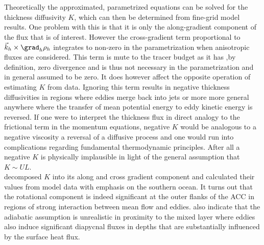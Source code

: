 \section*{\citealt{Eden2006,Eden2007a,eden2008towards}}\label{sec:hist_eden-K}
Theoretically the approximated, parametrized equations can be solved for the
thickness diffusivity $K$, which can then be determined from \eg fine-grid model
results. One problem with this is that it is only the along-gradient component
of the flux that is of interest. However the cross-gradient term proportional to
$\vec{k}_h \times \grad_h \rho_h$  integrates to non-zero in the parametrization
when anisotropic fluxes are considered. This term is mute to the tracer budget
as it has ,by definition, zero divergence and is thus not necessary in the
parametrization and in general assumed to be zero. It does however affect the
opposite operation of estimating $K$ from data.
Ignoring this term results in negative thickness diffusivities in regions where \eg eddies merge back into jets or more more general anywhere where the transfer of mean potential energy to eddy kinetic energy is reversed. If one were to interpret the thickness flux in direct analogy to the frictional term in the momentum equations, negative $K$ would be analogous to a negative viscosity \ie a reversal of a diffusive process and one would run into complications regarding fundamental thermodynamic principles. After all a negative $K$ is physically implausible in light of the general assumption that $K\sim U L$. \\
\citeauthor{Eden2006,Eden2007a,eden2008towards} decomposed $K$ into its along
and cross gradient component and calculated their values from model data with
emphasis on the southern ocean. It turns out that the rotational component is
indeed significant at the outer flanks of the ACC \ie in regions of strong
interaction between mean flow and eddies.
\citeauthor{Eden2006,Eden2007a,eden2008towards} also indicate that the adiabatic
assumption is unrealistic in proximity to the mixed layer where eddies also
induce significant diapycnal fluxes in depths that are substantially influenced
by \eg the surface heat flux.



